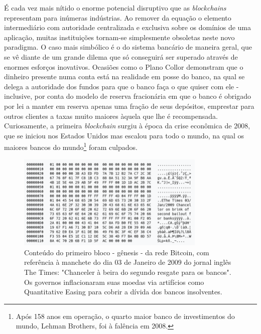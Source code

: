 \documentclass[a4paper,12pt]{monografia}
\theoremstyle{plain}
\theoremstyle{definition}
\theoremstyle{remark}
\begin{document}
\'{E} cada vez mais n\'{i}tido o enorme potencial disruptivo que as \textit{blockchains} representam para in\'{u}meras ind\'{u}strias.
Ao remover da equa\c{c}\~{a}o o elemento intermedi\'{a}rio com autoridade centralizada e exclusiva sobre os dom\'{i}nios de uma aplica\c{c}\~{a}o, muitas institui\c{c}\~{o}es tornam-se simplesmente obsoletas neste novo paradigma.
O caso mais simb\'{o}lico \'{e} o do sistema banc\'{a}rio de maneira geral, que se v\^{e} diante de um grande dilema que s\'{o} conseguir\'{a} ser superado atrav\'{e}s de enormes esfor\c{c}os inovativos.
Ocasi\~oes como o Plano Collor demonstram que o dinheiro presente numa conta est\'a na realidade em posse do banco, na qual se delega a autoridade dos fundos para que o banco fa\c{c}a o que quiser com ele - inclusive, por conta do modelo de reserva fracion\'aria em que o banco \'e obrigado por lei a manter em reserva apenas uma fra\c{c}\~ao de seus dep\'ositos, emprestar para outros clientes a taxas muito maiores \`aquela que lhe \'e recompensada.
Curiosamente, a primeira \textit{blockchain} surgiu \`{a} \'{e}poca da crise econ\^{o}mica de 2008, que se iniciou nos Estados Unidos mas escalou para todo o mundo, na qual os maiores bancos do mundo\footnote{Ap\'os 158 anos em opera\c{c}\~ao, o quarto maior banco de investimentos do mundo, Lehman Brothers, foi \`a fal\^encia em 2008.} foram culpados.

\begin{figure}[ht]
 \begin{center}
   \includegraphics[width=90mm,scale=1.0]{./figs/genesis.png}
   \caption[Bloco g\^enesis da rede Bitcoin]{Conte\'udo do primeiro bloco - g\^enesis - da rede Bitcoin, com refer\^encia \`a manchete do dia 03 de Janeiro de 2009 do jornal ingl\^es The Times: "Chanceler \`a beira do segundo resgate para os bancos". Os governos inflacionaram suas moedas via artif\'icios como Quantitative Easing para cobrir a d\'ivida dos bancos insolventes.}
   \label{fig:genesis}
 \end{center}
\end{figure}
\end{document}
